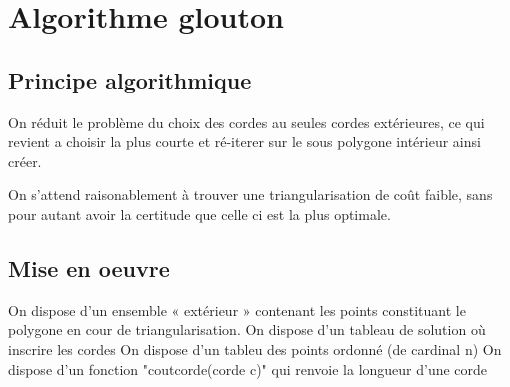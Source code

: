 \documentclass[a4paper,10pt]{article}
\begin{document}
\section{Algorithme glouton}


\subsection{Principe algorithmique}

On réduit le problème du choix des cordes au seules cordes extérieures, ce qui revient a choisir la plus courte et ré-iterer sur le sous polygone intérieur ainsi créer.

On s'attend raisonablement à trouver une triangularisation de coût faible, sans pour autant avoir la certitude que celle ci est la plus optimale.

\subsection{Mise en oeuvre}
 

On dispose d'un ensemble « extérieur » contenant les points constituant le polygone en cour de triangularisation.
On dispose d'un tableau de solution où inscrire les cordes
On dispose d'un tableu des points ordonné (de cardinal n)
On dispose d'un fonction "coutcorde(corde c)" qui renvoie la longueur d'une corde
 
 
 
\end{document}
